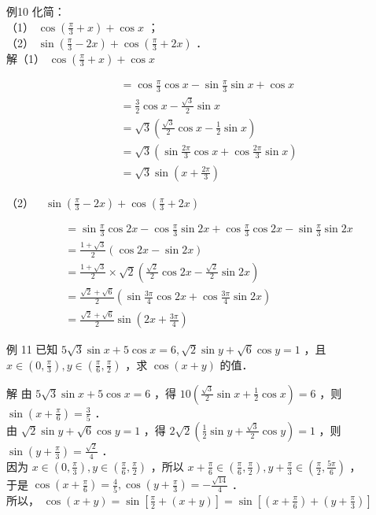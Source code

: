 \documentclass[10pt]{article}
\begin{document}
例10 化简：\\
（1） \(\cos \left(\frac{\pi}{3}+x\right)+\cos x\) ；\\
（2） \(\sin \left(\frac{\pi}{3}-2 x\right)+\cos \left(\frac{\pi}{3}+2 x\right)\) ．\\
解（1） \(\cos \left(\frac{\pi}{3}+x\right)+\cos x\)

\[
\begin{aligned}
& =\cos \frac{\pi}{3} \cos x-\sin \frac{\pi}{3} \sin x+\cos x \\
& =\frac{3}{2} \cos x-\frac{\sqrt{3}}{2} \sin x \\
& =\sqrt{3}\left(\frac{\sqrt{3}}{2} \cos x-\frac{1}{2} \sin x\right) \\
& =\sqrt{3}\left(\sin \frac{2 \pi}{3} \cos x+\cos \frac{2 \pi}{3} \sin x\right) \\
& =\sqrt{3} \sin \left(x+\frac{2 \pi}{3}\right)
\end{aligned}
\]

（2）\(\quad \sin \left(\frac{\pi}{3}-2 x\right)+\cos \left(\frac{\pi}{3}+2 x\right)\)

\[
\begin{aligned}
& =\sin \frac{\pi}{3} \cos 2 x-\cos \frac{\pi}{3} \sin 2 x+\cos \frac{\pi}{3} \cos 2 x-\sin \frac{\pi}{3} \sin 2 x \\
& =\frac{1+\sqrt{3}}{2}(\cos 2 x-\sin 2 x) \\
& =\frac{1+\sqrt{3}}{2} \times \sqrt{2}\left(\frac{\sqrt{2}}{2} \cos 2 x-\frac{\sqrt{2}}{2} \sin 2 x\right) \\
& =\frac{\sqrt{2}+\sqrt{6}}{2}\left(\sin \frac{3 \pi}{4} \cos 2 x+\cos \frac{3 \pi}{4} \sin 2 x\right) \\
& =\frac{\sqrt{2}+\sqrt{6}}{2} \sin \left(2 x+\frac{3 \pi}{4}\right)
\end{aligned}
\]

例 11 已知 \(5 \sqrt{3} \sin x+5 \cos x=6, \sqrt{2} \sin y+\sqrt{6} \cos y=1\) ，且 \(x \in\left(0, \frac{\pi}{3}\right), y \in\left(\frac{\pi}{6}, \frac{\pi}{2}\right)\) ，求 \(\cos (x+y)\) 的值．

解 由 \(5 \sqrt{3} \sin x+5 \cos x=6\) ，得 \(10\left(\frac{\sqrt{3}}{2} \sin x+\frac{1}{2} \cos x\right)=6\) ，则 \(\sin \left(x+\frac{\pi}{6}\right)=\frac{3}{5}\) ．\\
由 \(\sqrt{2} \sin y+\sqrt{6} \cos y=1\) ，得 \(2 \sqrt{2}\left(\frac{1}{2} \sin y+\frac{\sqrt{3}}{2} \cos y\right)=1\) ，则 \(\sin \left(y+\frac{\pi}{3}\right)=\frac{\sqrt{2}}{4}\) ．\\
因为 \(x \in\left(0, \frac{\pi}{3}\right), y \in\left(\frac{\pi}{6}, \frac{\pi}{2}\right)\) ，所以 \(x+\frac{\pi}{6} \in\left(\frac{\pi}{6}, \frac{\pi}{2}\right), y+\frac{\pi}{3} \in\left(\frac{\pi}{2}, \frac{5 \pi}{6}\right)\) ，\\
于是 \(\cos \left(x+\frac{\pi}{6}\right)=\frac{4}{5}, \cos \left(y+\frac{\pi}{3}\right)=-\frac{\sqrt{14}}{4}\) ．\\
所以， \(\cos (x+y)=\sin \left[\frac{\pi}{2}+(x+y)\right]=\sin \left[\left(x+\frac{\pi}{6}\right)+\left(y+\frac{\pi}{3}\right)\right]\)
\end{document}
